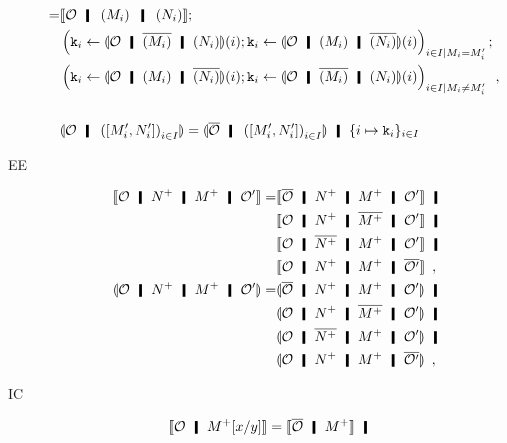 \begin{description}
\begin{align*}
{       } \\
       =& \semo{\hypert\hmid \left(M_i\right) \hmid
       \left(N_i\right)}; \\
       &\left(\p k_i\leftarrow
       \semoi{\hypert\hmid \overline{(M_i)}\hmid
       (N_i)}(i)
       ; \p k_i \leftarrow \semoi{\hypert\hmid {(M_i)}\hmid
       \overline{(N_i)}}(i)\right)_{i\in I\mid M_i =
       M'_i};
       \\ &
       \left(\p k_i\leftarrow
       \semoi{\hypert\hmid {(M_i)}\hmid
       \overline{(N_i)}}(i)
       ; \p k_i \leftarrow
       \semoi{\hypert\hmid \overline{(M_i)}\hmid
       (N_i)}(i)
       \right)_{i\in I\mid M_i \neq
       M'_i}\enspace,\\ \\
       &\semoi{ \hypert \hmid \left(\cotuple{M'_i,N'_i}\right)_{i\in I}
       }
       =
       \semoi{\overline{\hypert}\hmid \left(\cotuple{M'_i,N'_i}\right)_{i \in I}}
       \hmid \{i\mapsto \p k_i\}_{i\in I}
      \end{align*}
 \item[EE]
      \begin{align*}
       \semo{\hypert \hmid \m{N} \hmid \m{M} \hmid \hypert'}
       =&
       \semo{\overline{\hypert}\hmid \m{N}\hmid \m{M}\hmid \hypert'}
       \hmid \\
       &
       \semo{{\hypert}\hmid \m{N}\hmid \overline{\m{M}}\hmid \hypert'}
       \hmid \\
       &
       \semo{{\hypert}\hmid \overline{\m{N}}\hmid \m{M}\hmid \hypert'}
       \hmid \\
       &
       \semo{{\hypert}\hmid \m{N}\hmid \m{M}\hmid
       \overline{\hypert'}}\enspace,\\
       \semoi{\hypert \hmid \m{N} \hmid \m{M} \hmid \hypert'}
       =&
       \semoi{\overline{\hypert}\hmid \m{N}\hmid \m{M}\hmid \hypert'}
       \hmid \\
       &
       \semoi{{\hypert}\hmid \m{N}\hmid \overline{\m{M}}\hmid \hypert'}
       \hmid \\
       &
       \semoi{{\hypert}\hmid \overline{\m{N}}\hmid \m{M}\hmid \hypert'}
       \hmid \\
       &
       \semoi{{\hypert}\hmid \m{N}\hmid \m{M}\hmid
       \overline{\hypert'}}\enspace,
      \end{align*}
 \item[IC]
      \begin{align*}
       \semo{\hypert\hmid \m{M}[x/y]}&=
       \semo{\overline{\hypert}\hmid \m{M}} \hmid

\end{align*}
\end{description}
